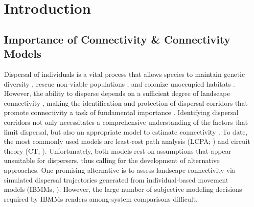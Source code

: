\documentclass[abstract=on,10pt,a4paper,bibliography=totocnumbered]{article}
\begin{document}
\newpage

\onehalfspacing
\tableofcontents
\doublespacing

\newpage
{}


\section{Introduction}

\subsection{Importance of Connectivity \& Connectivity Models}
Dispersal of individuals is a vital process that allows species to maintain
genetic diversity \citep{Perrin.1999, Perrin.2000, Frankham.2002, Leigh.2012,
Baguette.2013}, rescue non-viable populations \citep{Brown.1977}, and colonize
unoccupied habitats \citep{Hanski.1999b, MacArthur.2001}. However, the ability
to disperse depends on a sufficient degree of landscape connectivity
\citep{Fahrig.2003, Clobert.2012}, making the identification and protection of
dispersal corridors that promote connectivity a task of fundamental importance
\citep{Nathan.2008, Doerr.2011, Rudnick.2012}. Identifying dispersal corridors
not only necessitates a comprehensive understanding of the factors that limit
dispersal, but also an appropriate model to estimate connectivity
\citep{Baguette.2013, Vasudev.2015, Hofmann.2021}. To date, the most commonly
used models are least-cost path analysis (LCPA; \citealp{Adriaensen.2003}) and
circuit theory (CT; \citealp{McRae.2006, McRae.2008}). Unfortunately, both
models rest on assumptions that appear unsuitable for dispersers, thus calling
for the development of alternative approaches. One promising alternative is to
assess landscape connectivity via simulated dispersal trajectories generated
from individual-based movement models (IBMMs, \citealp{Diniz.2019}). However,
the large number of subjective modeling decisions required by IBMMs renders
among-system comparisons difficult.

\end{document}
